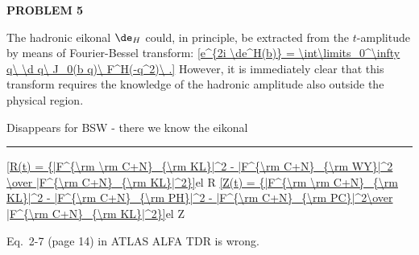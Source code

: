 {\bf PROBLEM 5}

The hadronic eikonal $\de_H$ could, in principle, be extracted from the $t$-amplitude by means of Fourier-Bessel transform:
\eqref{e^{2i \de^H(b)} = \int\limits_0^\infty q\ \d q\ J_0(b q)\ F^H(-q^2)\ .}{}
However, it is immediately clear that this transform requires the knowledge of the hadronic amplitude also outside the physical region.

Disappears for BSW - there we know the eikonal


\iffalse
\eqref{F^{\rm C+H}_{\rm WY} = F^C(t) e^{i\al\Ph(t) + F^H(t) }}{el WY}
\TODO{Comment on FC and FH, c.f. Eq.~(6) in \bref{wy68}}

\eqref{\Phi_{\rm WY}(t) =  -\al\log {t\over t_{\rm min}} + \int\limits_{t_{\rm min}}^0 {\d t'\over |t-t'|} \left({F^H(t')\over F^H(t)} - 1\right) }{el phase WY}
\TODO{Check the sign of the second term!!!}


The \KL{} formula.
\eqref{F^{\rm C+H}_{\rm KL}(t) = \pm {\al s\over t} f^2(t) + F^H(t)\ e^{i\al\Ps(t)}\ ,}{el FCH KL}
where
\eqref{\Ps_{\rm KL}(t) = \mp \int\limits_{t_{\rm min}}^0 \d t' \left[ \log {t'\over t} \left( f^2(t') \right)' - {1\over 2\pi} \left({F^H(t')\over F^H(t)} - 1\right) I(t, t') \right]}{el phase KL}
\eqref{I(t, t') = \int\limits_0^{2\pi} \d\ph {f^2(t'')\over t''}\ ,\qquad t'' = t + t' + 2\sqrt{t t'} \cos\ph\ .}{el KL I}

Compared to \bref{kl94} we wrote the correction to the hadronic amplitude in a exponentiated way. Both are, in principle, equivalent since the phase $\Phi_{\rm KL}$ has been derived under the assumption that $\O{\al^2}$ terms can be neglected. Another assumption leading to this phase was that $f(t_{\rm min}) = 0$. Although this is a very good assumption for any real form factor, it makes it uneasy to compare the phases of \KL{} and \WY. Fortunately, it is easy to correct \Eq{el phase KL} to allow for any form factor dependence:
\eqref{\Ps_{\rm KL,corr}(t) = \Ps_{\rm KL}(t) \pm f^2(t_{\rm min}) \log {t\over t_{\rm min}}\ .}{el phase KL corr}
Now it is easy to verify that the WY phase corresponds to KL phase, if no form factors are used:
\eqref{\Ps_{\rm KL,corr}(t) \mathop{\longrightarrow}\limits^{f(t)\to 1} - \Ph_{\rm WY}(t)}{el KL WY correspondance}

\TODO{Check signs}
\fi

\vskip1cm
\hrule

\eqref{R(t) = {|F^{\rm \rm C+N}_{\rm KL}|^2 - |F^{\rm C+N}_{\rm WY}|^2 \over |F^{\rm C+N}_{\rm KL}|^2}}{el R}
\eqref{Z(t) = {|F^{\rm \rm C+N}_{\rm KL}|^2 - |F^{\rm C+N}_{\rm PH}|^2 - |F^{\rm C+N}_{\rm PC}|^2\over |F^{\rm C+N}_{\rm KL}|^2}}{el Z}



Eq.~2-7 (page 14) in ATLAS ALFA TDR  is wrong.


